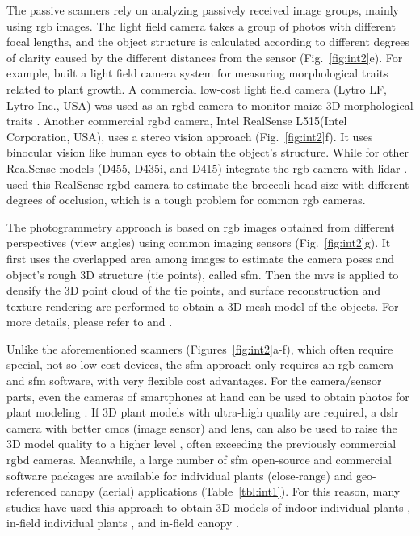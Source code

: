 The passive scanners rely on analyzing passively received image groups, mainly using \gls{rgb} images. The light field camera takes a group of photos with different focal lengths, and the object structure is calculated according to different degrees of clarity caused by the different distances from the sensor (Fig.~\ref{fig:int2}e). For example, \citet{apelt_phytotyping_2015} built a light field camera system for measuring morphological traits related to plant growth. A commercial low-cost light field camera (Lytro LF, Lytro Inc., USA) was used as an \gls{rgbd} camera to monitor maize 3D morphological traits \citep{schima_imagine_2016}. Another commercial \gls{rgbd} camera, Intel RealSense L515(Intel Corporation, USA), uses a stereo vision approach (Fig.~\ref{fig:int2}f). It uses binocular vision like human eyes to obtain the object's structure. While for other RealSense models (D455, D435i, and D415) integrate the \gls{rgb} camera with \gls{lidar} \citep[Table 5]{bartol_review_2021}. \citet{blok_image_2021} used this RealSense \gls{rgbd} camera to estimate the broccoli head size with different degrees of occlusion, which is a tough problem for common \gls{rgb} cameras. 

The photogrammetry approach is based on \gls{rgb} images obtained from different perspectives (view angles) using common imaging sensors (Fig.~\ref{fig:int2}g). It first uses the overlapped area among images to estimate the camera poses and object's rough 3D structure (tie points), called \acrfull{sfm}. Then the \gls{mvs} is applied to densify the 3D point cloud of the tie points, and surface reconstruction and texture rendering are performed to obtain a 3D mesh model of the objects. For more details, please refer to \citet{hartley_multiple_2003} and \citet{snavely_scene_2010}.

Unlike the aforementioned scanners (Figures~\ref{fig:int2}a-f), which often require special, not-so-low-cost devices, the \gls{sfm} approach only requires an \gls{rgb} camera and \gls{sfm} software, with very flexible cost advantages. For the camera/sensor parts, even the cameras of smartphones at hand can be used to obtain photos for plant modeling \citep{li_measuring_2020}. If 3D plant models with ultra-high quality are required, a \gls{dslr} camera with better \gls{cmos} (image sensor) and lens, can also be used to raise the 3D model quality to a higher level \citep{nguyen_3d_2016, drofova_use_2023}, often exceeding the previously commercial \gls{rgbd} cameras. Meanwhile, a large number of \gls{sfm} open-source and commercial software packages are available for individual plants (close-range) and geo-referenced canopy (aerial) applications (Table~\ref{tbl:int1}). For this reason, many studies have used this approach to obtain 3D models of indoor individual plants \citep{wu_mvs-pheno_2020, zhou_automated_2019}, in-field individual plants \citep{jay_field_2015, herrero_structural_2023}, and in-field canopy \citep{kim_modeling_2018, herrero_canopy_2020}.

